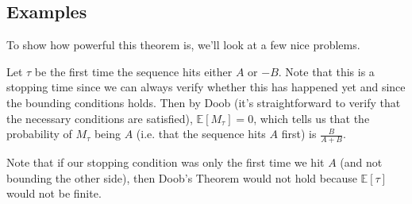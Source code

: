 \subsection{Examples}
\noindent To show how powerful this theorem is, we'll look at a few nice problems.
\begin{solution}
	Let $\tau$ be the first time the sequence hits either $A$ or $-B$. Note that this is a stopping time since we can always verify whether this has happened yet and since the bounding conditions holds. Then by Doob (it's straightforward to verify that the necessary conditions are satisfied), $\mathbb E[M_\tau] = 0$, which tells us that the probability of $M_\tau$ being $A$ (i.e. that the sequence hits $A$ first) is $\frac{B}{A+B}$.
\end{solution}
	Note that if our stopping condition was only the first time we hit $A$ (and not bounding the other side), then Doob's Theorem would not hold because $\mathbb E[\tau]$ would not be finite.


